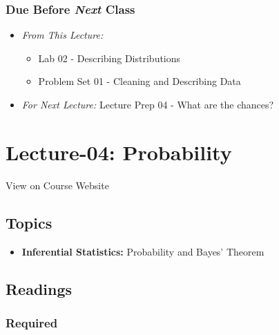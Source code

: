 \documentclass[]{book}
\providecommand{\tightlist}{%
  \setlength{\itemsep}{0pt}\setlength{\parskip}{0pt}}
\theoremstyle{definition}
\theoremstyle{definition}
\theoremstyle{definition}
\theoremstyle{remark}
\begin{document}
\hypertarget{due-before-next-class-3}{%
\subsubsection*{\texorpdfstring{Due Before \emph{Next}
Class}{Due Before Next Class}}\label{due-before-next-class-3}}

\begin{itemize}
\tightlist
\item
  \emph{From This Lecture:}

  \begin{itemize}
  \tightlist
  \item
    Lab 02 - Describing Distributions
  \item
    Problem Set 01 - Cleaning and Describing Data
  \end{itemize}
\item
  \emph{For Next Lecture:} Lecture Prep 04 - What are the chances?
\end{itemize}

\hypertarget{lecture-04-probability}{%
\section*{Lecture-04: Probability}\label{lecture-04-probability}}

View on Course Website

\hypertarget{topics-4}{%
\subsection*{Topics}\label{topics-4}}

\begin{itemize}
\tightlist
\item
  \textbf{Inferential Statistics:} Probability and Bayes' Theorem
\end{itemize}

\hypertarget{readings-5}{%
\subsection*{Readings}\label{readings-5}}

\hypertarget{required-5}{%
\subsubsection*{Required}\label{required-5}}
\end{document}
